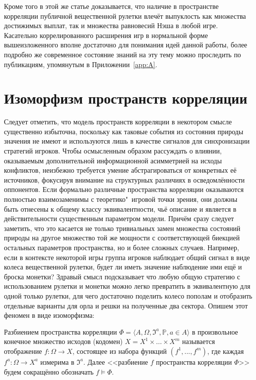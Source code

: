 Кроме того в этой же статье доказывается, что наличие в пространстве корреляции публичной вещественной рулетки влечёт выпуклость как множества достижимых выплат, так и множества равновесий Нэша в любой игре. Касательно коррелированного расширения игр в нормальной форме вышеизложенного вполне достаточно для понимания идей данной работы, более подробно же современное состояние знаний на эту тему можно проследить по публикациям, упомянутым в Приложении~\cref{app:A}.

\section{Изоморфизм пространств корреляции}\label{sec:ch1/sec2}

Следует отметить, что модель пространств корреляции в некотором смысле существенно избыточна, поскольку как таковые события из состояния природы значения не имеют и используются лишь в качестве сигналов для синхронизации стратегий игроков. Чтобы осмысленным образом рассуждать о влиянии, оказываемым дополнительной информационной асимметрией на исходы конфликтов, неизбежно требуется умение абстрагироваться от конкретных её источников, фокусируя внимание на структурных различиях в осведомлённости оппонентов. Если формально различные пространства корреляции оказываются полностью взаимозаменимы с теоретико"~игровой точки зрения, они должны быть отнесены к общему классу эквивалентности, чьё описание и является в действительности существенным параметром модели. Причём сразу следует заметить, что это касается не только тривиальных замен множества состояний природы на другое множество той же мощности с соответствующей биекцией остальных параметров пространства, но и более сложных случаев. Например, если в контексте некоторой игры группа игроков наблюдает общий сигнал в виде колеса вещественной рулетки, будет ли иметь значение наблюдение ими ещё и броска монетки? Здравый смысл подсказывает что любую общую стратегию с использованием рулетки и монетки можно легко превратить в эквивалентную для одной только рулетки, для чего достаточно поделить колесо пополам и отобразить отдельные варианты для орла и решки на полученные два сектора. Опишем этот феномен в виде изоморфизма:
\begin{definition}
	Разбиением пространства корреляции $\Phi = \langle A, \Omega, \mathfrak{I}^a, \mathbb{P}, a \in A \rangle$ в произвольное конечное множество исходов (кодомен) $X = X^1 \times ... \times X^m$ называется отображение $f : \Omega \rightarrow X$, состоящее из набора функций $(f^1, ..., f^m)$, где каждая $f^a : \Omega \rightarrow X^a$ измерима в $\mathfrak{I}^a$. Далее <<разбиение $f$ пространства корреляции $\Phi$>> будем сокращённо обозначать $f \models \Phi$.
\end{definition}

